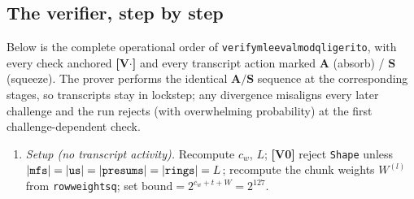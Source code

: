 \documentclass[11pt]{article}
\newcommand{\cw}{c_w}
\newcommand{\code}[1]{{\def\_{\textunderscore\allowbreak}\texttt{#1}}}
\newcommand{\Vc}[1]{\textbf{[V#1]}}    %
\begin{document}
\subsection{The verifier, step by step}
\label{sec:steps}

Below is the complete operational order of
\code{verify\_mle\_eval\_mod\_q\_ligerito}, with every check anchored
\Vc{$\cdot$} and every transcript action marked
$\mathbf{A}$ (absorb) / $\mathbf{S}$ (squeeze).  The prover performs the
identical $\mathbf{A}/\mathbf{S}$ sequence at the corresponding stages, so
transcripts stay in lockstep; any divergence misaligns every later
challenge and the run rejects (with overwhelming probability) at the first
challenge-dependent check.

\begin{enumerate}[leftmargin=2.2em, itemsep=2pt]
\item \emph{Setup (no transcript activity).}  Recompute
  $\cw$, $L$; \Vc{0} reject \code{Shape} unless
  $|\code{mfs}| = |\code{us}| = |\code{presums}| = |\code{rings}| = L$;
  recompute the chunk weights $W^{(l)}$ from \code{row\_weights\_q}; set
  $\mathrm{bound} = 2^{\cw + t + W} = 2^{127}$.


\end{enumerate}
\end{document}
